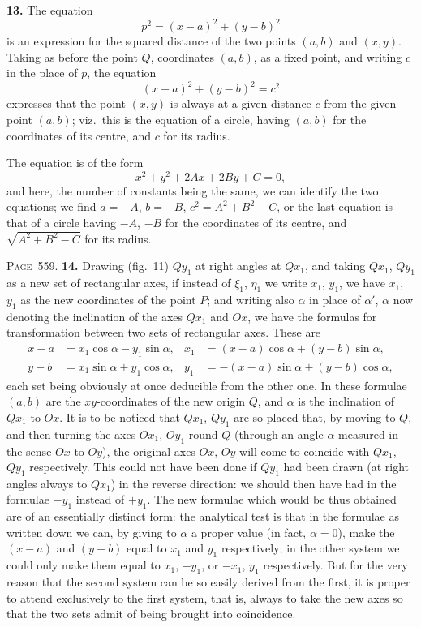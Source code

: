 \documentclass[11pt,a4paper]{article}
\theoremstyle{definition}
\begin{document}
\textbf{13.} The equation
\[
p^2 = (x-a)^2+(y-b)^2
\]
is an expression for the squared distance of the two points $(a,b)$ and $(x,y)$. Taking as before the point $Q$, coordinates $(a,b)$, as a fixed point, and writing $c$ in the place of $p$, the equation
\[
(x-a)^2+(y-b)^2=c^2
\]
expresses that the point $(x,y)$ is always at a given distance $c$ from the given point $(a,b)$; viz.\ this is the equation of a circle, having $(a,b)$ for the coordinates of its centre, and $c$ for its radius.

The equation is of the form
\[
x^2+y^2+2Ax+2By+C=0,
\]
and here, the number of constants being the same, we can identify the two equations; we find $a=-A$, $b=-B$, $c^2=A^2+B^2-C$, or the last equation is that of a circle having $-A$, $-B$ for the coordinates of its centre, and $\sqrt{A^2+B^2-C}$ for its radius.

\newpage
\noindent\textsc{Page~559.} \textbf{14.} Drawing (fig.~11) $Qy_1$ at right angles at $Qx_1$, and taking $Qx_1$, $Qy_1$ as a new set of rectangular axes, if instead of $\xi_1$, $\eta_1$ we write $x_1$, $y_1$, we have $x_1$, $y_1$ as the new coordinates of the point $P$; and writing also $\alpha$ in place of $\alpha'$, $\alpha$ now denoting the inclination of the axes $Qx_1$ and $Ox$, we have the formulas for transformation between two sets of rectangular axes. These are
\begin{align*}
x-a &= x_1\cos\alpha - y_1\sin\alpha, & x_1 &= (x-a)\cos\alpha + (y-b)\sin\alpha,\\
y-b &= x_1\sin\alpha + y_1\cos\alpha, & y_1 &= -(x-a)\sin\alpha + (y-b)\cos\alpha,
\end{align*}
each set being obviously at once deducible from the other one. In these formulae $(a,b)$ are the $xy$-coordinates of the new origin $Q$, and $\alpha$ is the inclination of $Qx_1$ to $Ox$. It is to be noticed that $Qx_1$, $Qy_1$ are so placed that, by moving to $Q$, and then turning the axes $Ox_1$, $Oy_1$ round $Q$ (through an angle $\alpha$ measured in the sense $Ox$ to $Oy$), the original axes $Ox$, $Oy$ will come to coincide with $Qx_1$, $Qy_1$ respectively. This could not have been done if $Qy_1$ had been drawn (at right angles always to $Qx_1$) in the reverse direction: we should then have had in the formulae $-y_1$ instead of $+y_1$. The new formulae which would be thus obtained are of an essentially distinct form: the analytical test is that in the formulae as written down we can, by giving to $\alpha$ a proper value (in fact, $\alpha=0$), make the $(x-a)$ and $(y-b)$ equal to $x_1$ and $y_1$ respectively; in the other system we could only make them equal to $x_1$, $-y_1$, or $-x_1$, $y_1$ respectively. But for the very reason that the second system can be so easily derived from the first, it is proper to attend exclusively to the first system, that is, always to take the new axes so that the two sets admit of being brought into coincidence.
\end{document}
